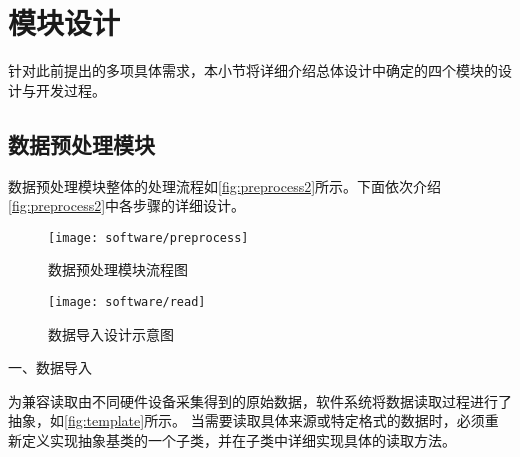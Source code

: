 
\section{模块设计}

针对此前提出的多项具体需求，本小节将详细介绍总体设计中确定的四个模块的设计与开发过程。
\subsection{数据预处理模块}

数据预处理模块整体的处理流程如\autoref{fig:preprocess2}所示。下面依次介绍\autoref{fig:preprocess2}中各步骤的详细设计。
\begin{figure}[htbp]
    \centering
    \texttt{[image: software/preprocess]}
    \caption{\label{fig:preprocess2}数据预处理模块流程图}
\end{figure}
\begin{figure}[htbp]
    \centering
    \texttt{[image: software/read]}
    \caption{\label{fig:template}数据导入设计示意图}
\end{figure}
一、数据导入

为兼容读取由不同硬件设备采集得到的原始数据，软件系统将数据读取过程进行了抽象，如\autoref{fig:template}所示。
当需要读取具体来源或特定格式的数据时，必须重新定义实现抽象基类的一个子类，并在子类中详细实现具体的读取方法。


